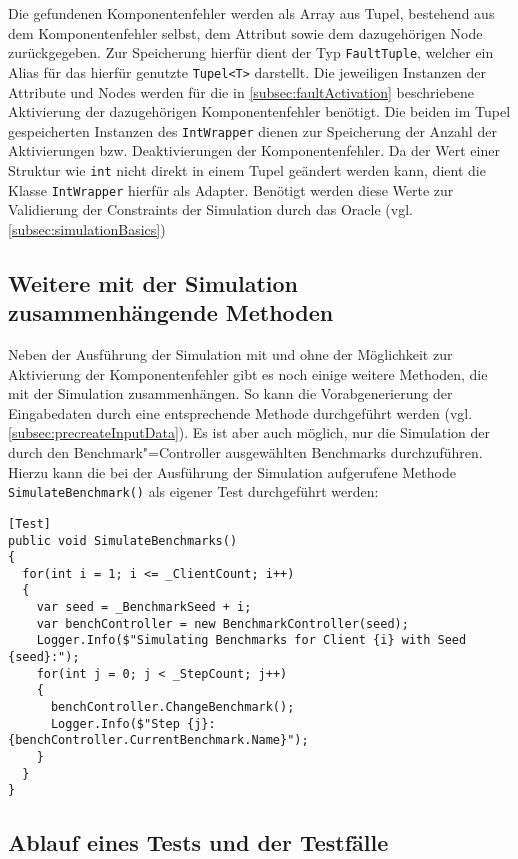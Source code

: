 Die gefundenen Komponentenfehler werden als Array aus Tupel, bestehend aus dem Komponentenfehler selbst, dem Attribut sowie dem dazugehörigen Node zurückgegeben.
Zur Speicherung hierfür dient der Typ \texttt{FaultTuple}, welcher ein Alias für das hierfür genutzte \texttt{Tupel<T>} darstellt.
Die jeweiligen Instanzen der Attribute und Nodes werden für die in \cref{subsec:faultActivation} beschriebene Aktivierung der dazugehörigen Komponentenfehler benötigt.
Die beiden im Tupel gespeicherten Instanzen des \texttt{IntWrapper} dienen zur Speicherung der Anzahl der Aktivierungen bzw. Deaktivierungen der Komponentenfehler.
Da der Wert einer Struktur wie \texttt{int} nicht direkt in einem Tupel geändert werden kann, dient die Klasse \texttt{IntWrapper} hierfür als Adapter.
Benötigt werden diese Werte zur Validierung der Constraints der Simulation durch das Oracle (vgl. \cref{subsec:simulationBasics})

\subsection{Weitere mit der Simulation zusammenhängende Methoden}
\label{subsec:simulationUtilities}

Neben der Ausführung der Simulation mit und ohne der Möglichkeit zur Aktivierung der Komponentenfehler gibt es noch einige weitere Methoden, die mit der Simulation zusammenhängen.
So kann \zB die Vorabgenerierung der Eingabedaten durch eine entsprechende Methode durchgeführt werden (vgl. \cref{subsec:precreateInputData}).
Es ist aber auch möglich, nur die Simulation der durch den Benchmark"=Controller ausgewählten Benchmarks durchzuführen.
Hierzu kann die bei der Ausführung der Simulation aufgerufene Methode \texttt{SimulateBenchmark()} als eigener Test durchgeführt werden:

\begin{lstlisting}[label=lst:hadoopSimulationBenchmarks,style=cs,
caption={Simulation der auszuführenden Benchmarks}]
[Test]
public void SimulateBenchmarks()
{
  for(int i = 1; i <= _ClientCount; i++)
  {
    var seed = _BenchmarkSeed + i;
    var benchController = new BenchmarkController(seed);
    Logger.Info($"Simulating Benchmarks for Client {i} with Seed {seed}:");
    for(int j = 0; j < _StepCount; j++)
    {
      benchController.ChangeBenchmark();
      Logger.Info($"Step {j}: {benchController.CurrentBenchmark.Name}");
    }
  }
}
\end{lstlisting}

\subsection{Ablauf eines Tests und der Testfälle}
\label{subsec:simulationStep}

